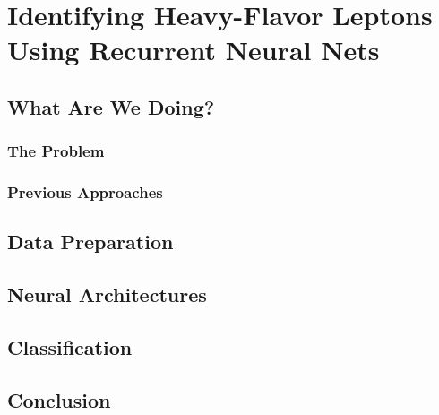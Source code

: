 \chapter{Identifying Heavy-Flavor Leptons Using Recurrent Neural Nets}

\section{What Are We Doing?}

\subsection{The Problem}

\subsection{Previous Approaches}



\section{Data Preparation}

\section{Neural Architectures}

\section{Classification}

\section{Conclusion}